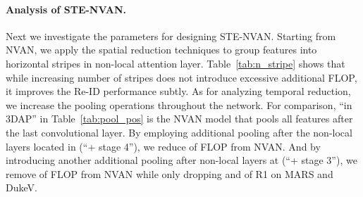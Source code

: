 \documentclass{bmvc2k}
\begin{document}
\vspace{-3mm}

\paragraph{Analysis of STE-NVAN.}
Next we investigate the parameters for designing STE-NVAN.
Starting from NVAN, we apply the spatial reduction techniques to group features into horizontal stripes in non-local attention layer.
Table~\ref{tab:n_stripe} shows that while increasing number of stripes  does not introduce excessive additional FLOP, it improves the Re-ID performance subtly.
As for analyzing temporal reduction, we increase the pooling operations throughout the network.
For comparison, ``in 3DAP'' in Table~\ref{tab:pool_pos} is the NVAN model that pools all features after the last convolutional layer.
By employing additional pooling after the non-local layers located in  (``+ stage 4''), we reduce  of FLOP from NVAN.
And by introducing another additional pooling after non-local layers at  (``+ stage 3''), we remove  of FLOP from NVAN while only dropping  and  of R1 on MARS and DukeV.
\end{document}

